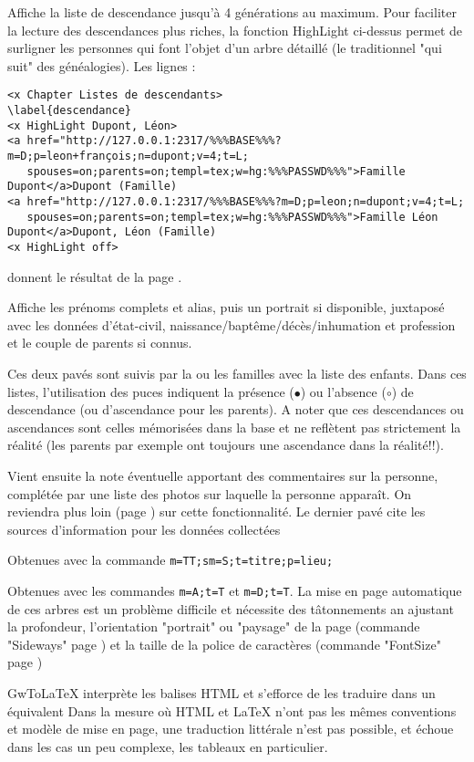\begin{description}[style=nextline]
\item[Liste de descendance] Affiche la liste de descendance jusqu'à 4
générations au maximum. Pour faciliter la lecture des descendances plus riches,
la fonction HighLight ci-dessus permet de surligner les personnes
qui font l'objet d'un arbre détaillé (le traditionnel "qui suit" des généalogies).
Les lignes :
\begin{verbatim}
<x Chapter Listes de descendants>
\label{descendance}
<x HighLight Dupont, Léon>
<a href="http://127.0.0.1:2317/%%%BASE%%%?m=D;p=leon+françois;n=dupont;v=4;t=L;
   spouses=on;parents=on;templ=tex;w=hg:%%%PASSWD%%%">Famille Dupont</a>Dupont (Famille)
<a href="http://127.0.0.1:2317/%%%BASE%%%?m=D;p=leon;n=dupont;v=4;t=L;
   spouses=on;parents=on;templ=tex;w=hg:%%%PASSWD%%%">Famille Léon Dupont</a>Dupont, Léon (Famille)
<x HighLight off>
\end{verbatim}
donnent le résultat de la page \pageref{descendance}.

\item[Page perso] Affiche les prénoms complets et alias, puis
un portrait si disponible, juxtaposé avec les
données d'état-civil, naissance/baptême/décès/inhumation et profession
et le couple de parents si connus.

Ces deux pavés sont suivis par la ou les familles avec la liste des enfants.
Dans ces listes, l'utilisation des puces indiquent la présence ($\bullet$)
ou l'absence ($\circ$) de descendance (ou d'ascendance pour les parents).
A noter que ces descendances ou ascendances sont celles mémorisées dans la base
et ne reflètent pas strictement la réalité (les parents par exemple ont toujours
une ascendance dans la réalité!!).

Vient ensuite la note éventuelle apportant des commentaires sur la personne,
complétée par une liste des photos sur laquelle la personne apparaît. 
On reviendra plus loin (page \pageref{images}) sur cette fonctionnalité.
Le dernier pavé cite les sources d'information pour les données collectées


\item[Liste par titre] Obtenues avec la commande
\verb|m=TT;sm=S;t=titre;p=lieu;|

\item[Arbres] Obtenues avec les commandes \verb|m=A;t=T| et \verb|m=D;t=T|.
La mise en page automatique de ces arbres est un problème difficile et
nécessite des tâtonnements an ajustant la profondeur, l'orientation "portrait"
ou "paysage" de la page (commande "Sideways" page \pageref{sideways}) et la
taille de la police de caractères (commande "FontSize" page \pageref{fontsize})

\item[Autres pages] GwToLaTeX interprète les balises HTML et s'efforce de
les traduire dans un équivalent Dans la mesure où HTML et LaTeX n'ont pas
les mêmes conventions et modèle de mise en page, une traduction littérale
n'est pas possible, et échoue dans les cas un peu complexe, les tableaux 
en particulier.

\end{description}

